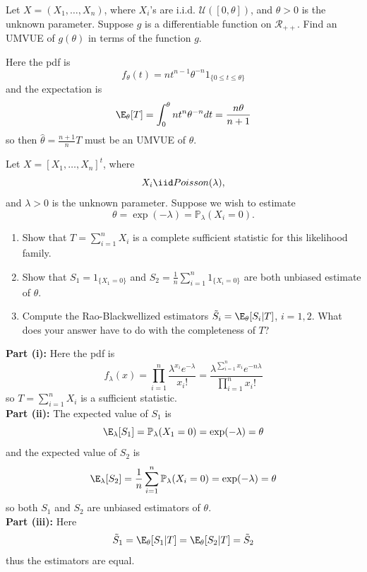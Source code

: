 \documentclass{article}
\begin{document}
\pagebreak

\begin{homeworkProblem}

  Let $X = (X_1, \dots, X_n)$, where $X_i$'s are i.i.d. $\mathcal{U}([0, \theta])$, and $\theta > 0$ is
  the unknown parameter. Suppose $g$ is a differentiable function on $\mathcal{R}_{++}$. Find an UMVUE of $g(\theta)$
  in terms of the function $g$. \\

  \solution

  Here the pdf is
  \[
    f_\theta(t) = nt^{n-1} \theta^{-n} 1_{\{ 0 \leq t \leq \theta\} }
  \]
  and the expectation is
  \[
    \E_\theta[T] = \int_0^\theta nt^n \theta^{-n} dt = \frac{n\theta}{n+1}
  \]
  so then $\hat{\theta} = \frac{n+1}{n} T$ must be an UMVUE of $\theta$.
\end{homeworkProblem}

\pagebreak

\begin{homeworkProblem}

  Let $X = [X_1, \dots, X_n]^t$, where
  \[
    X_i \iid Poisson(\lambda),
  \]
  and $\lambda > 0$ is the unknown parameter. Suppose we wish to estimate
  \[
    \theta = \exp(-\lambda) = \mathbb{P}_\lambda(X_i = 0).
  \]
  \begin{enumerate}[label=\roman*), topsep=5pt, itemsep=5pt]
    \item Show that $T = \sum_{i=1}^n X_i$ is a complete sufficient statistic for this likelihood family.
    \item Show that $S_1 = 1_{\{ X_1 = 0 \} }$ and $S_2 = \frac{1}{n} \sum_{i=1}^n 1_{\{ X_i = 0 \} }$ are both unbiased estimate of $\theta$.
    \item Compute the Rao-Blackwellized estimators $\tilde{S}_i = \E_\theta[S_i | T]$, $i = 1, 2$. What does your answer have to do with the completeness of $T$? \newline
  \end{enumerate}

  \solution

  \textbf{Part (i):} Here the pdf is
  \[
    f_\lambda(x) = \prod_{i=1}^n \frac{\lambda^{x_i} e^{-\lambda}}{x_i!} = \frac{\lambda^{\sum_{i=1}^n x_i} e^{-n\lambda}}{\prod_{i=1}^n x_i!}
  \]
  so $T = \sum_{i=1}^n X_i$ is a sufficient statistic. \\

  \textbf{Part (ii):} The expected value of $S_1$ is
  \[
    \E_\lambda[S_1] = \mathbb{P}_\lambda(X_1 = 0) = \exp(-\lambda) = \theta
  \]
  and the expected value of $S_2$ is
  \[
    \E_\lambda[S_2] = \frac{1}{n} \sum_{i=1}^n \mathbb{P}_\lambda(X_i = 0) = \exp(-\lambda) = \theta
  \]
  so both $S_1$ and $S_2$ are unbiased estimators of $\theta$. \\

  \textbf{Part (iii):} Here
  \[
    \tilde{S}_1 = \E_\theta[S_1 | T] = \E_\theta[S_2 | T] = \tilde{S}_2
  \]
  thus the estimators are equal.

\end{homeworkProblem}
\end{document}
